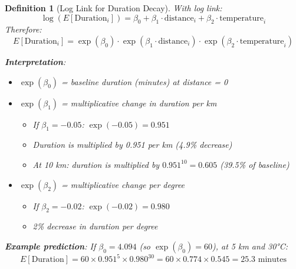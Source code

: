 \documentclass{article}
\newtheorem{definition}{Definition}
\begin{document}
\begin{definition}[Log Link for Duration Decay]
With log link:
\begin{equation}
\log(E[\text{Duration}_i]) = \beta_0 + \beta_1 \cdot \text{distance}_i + \beta_2 \cdot \text{temperature}_i
\end{equation}
Therefore:
\begin{equation}
E[\text{Duration}_i] = \exp(\beta_0) \cdot \exp(\beta_1 \cdot \text{distance}_i) \cdot \exp(\beta_2 \cdot \text{temperature}_i)
\end{equation}

\textbf{Interpretation}:
\begin{itemize}
    \item $\exp(\beta_0)$ = baseline duration (minutes) at distance = 0
    \item $\exp(\beta_1)$ = multiplicative change in duration per km
        \begin{itemize}
            \item If $\beta_1 = -0.05$: $\exp(-0.05) = 0.951$
            \item Duration is multiplied by 0.951 per km (4.9\% decrease)
            \item At 10 km: duration is multiplied by $0.951^{10} = 0.605$ (39.5\% of baseline)
        \end{itemize}
    \item $\exp(\beta_2)$ = multiplicative change per degree
        \begin{itemize}
            \item If $\beta_2 = -0.02$: $\exp(-0.02) = 0.980$
            \item 2\% decrease in duration per degree
        \end{itemize}
\end{itemize}

\textbf{Example prediction}:
If $\beta_0 = 4.094$ (so $\exp(\beta_0) = 60$), at 5 km and 30°C:
\begin{equation}
E[\text{Duration}] = 60 \times 0.951^5 \times 0.980^{30} = 60 \times 0.774 \times 0.545 = 25.3 \text{ minutes}
\end{equation}
\end{definition}
\end{document}

